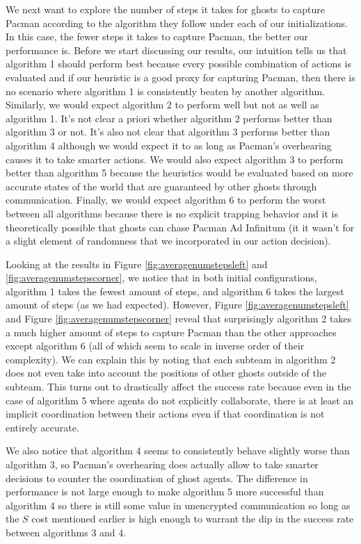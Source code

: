 \documentclass[11pt]{article}
\begin{document}
\noindent We next want to explore the number of steps it takes for ghosts to capture Pacman according to the algorithm they follow under each of our initializations. In this case, the fewer steps it takes to capture Pacman, the better our performance is. Before we start discussing our results, our intuition tells us that algorithm 1 should perform best because every possible combination of actions is evaluated and if our heuristic is a good proxy for capturing Pacman, then there is no scenario where algorithm 1 is consistently beaten by another algorithm. Similarly, we would expect algorithm 2 to perform well but not as well as algorithm 1. It's not clear a priori whether algorithm 2 performs better than algorithm 3 or not. It's also not clear that algorithm 3 performs better than algorithm 4 although we would expect it to as long as Pacman's overhearing causes it to take smarter actions. We would also expect algorithm 3 to perform better than algorithm 5 because the heuristics would be evaluated based on more accurate states of the world that are guaranteed by other ghosts through communication. Finally, we would expect algorithm 6 to perform the worst between all algorithms because there is no explicit trapping behavior and it is theoretically possible that ghosts can chase Pacman Ad Infinitum (it it wasn't for a slight element of randomness that we incorporated in our action decision). 

Looking at the results in Figure \ref{fig:averagenumstepsleft} and  \ref{fig:averagenumstepscorner}, we notice that in both initial configurations, algorithm 1 takes the fewest amount of steps, and algorithm 6 takes the largest amount of steps (as we had expected). However, Figure \ref{fig:averagenumstepsleft} and Figure \ref{fig:averagenumstepscorner} reveal that surprisingly algorithm 2 takes a much higher amount of steps to capture Pacman than the other approaches except algorithm 6 (all of which seem to scale in inverse order of their complexity). We can explain this by noting that each subteam in algorithm 2 does not even take into account the positions of other ghosts outside of the subteam. This turns out to drastically affect the success rate because even in the case of algorithm 5 where agents do not explicitly collaborate, there is at least an implicit coordination between their actions even if that coordination is not entirely accurate.

We also notice that algorithm 4 seems to consistently behave slightly worse than algorithm 3, so Pacman's overhearing does actually allow to take smarter decisions to counter the coordination of ghost agents. The difference in performance is not large enough to make algorithm 5 more successful than algorithm 4 so there is still some value in unencrypted communication so long as the $S$ cost mentioned earlier is high enough to warrant the dip in the success rate between algorithms 3 and 4.
\end{document}
